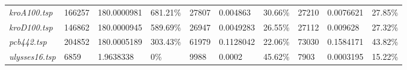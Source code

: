 \begin{landscape}
\begin{table}[]
\begin{tabular}{llllllllll}
  \textit{kroA100.tsp}                                  & 166257                                 & 180.0000981                                                                          & 681.21\%                                                                               & 27807                                  & 0.004863                                                                              & 30.66\%                                                                                & 27210                                  & 0.0076621                                                                            & 27.85\%                                                                                \\
  \textit{kroD100.tsp}                                  & 146862                                 & 180.0000945                                                                          & 589.69\%                                                                               & 26947                                  & 0.0049283                                                                             & 26.55\%                                                                                & 27112                                  & 0.009628                                                                             & 27.32\%                                                                                \\
  \textit{pcb442.tsp}                                   & 204852                                 & 180.0005189                                                                          & 303.43\%                                                                               & 61979                                  & 0.1128042                                                                             & 22.06\%                                                                                & 73030                                  & 0.1584171                                                                            & 43.82\%                                                                                \\
  \textit{ulysses16.tsp}                                & 6859                                   & 1.9638338                                                                            & 0\%                                                                                    & 9988                                   & 0.0002                                                                                & 45.62\%                                                                                & 7903                                   & 0.0003195                                                                            & 15.22\%                                                                                \\

\end{tabular}
\end{table}
\end{landscape}
